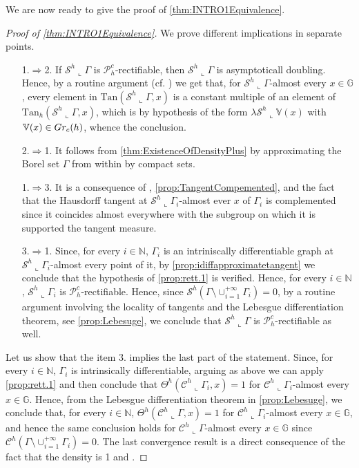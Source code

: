 \documentclass[10pt, a4paper,
oneside, headinclude,footinclude]{scrartcl}
\begin{document}
We are now ready to give the proof of \cref{thm:INTRO1Equivalence}.    
\begin{proof}[Proof of {\cref{thm:INTRO1Equivalence}}]
We prove different implications in separate points.

\begin{enumerate}
    \item[1.$\Rightarrow$2.] If $\mathcal{S}^h\llcorner\Gamma$ is $\mathscr{P}_h^c$-rectifiable, then $\mathcal{S}^h\llcorner\Gamma$ is asymptoticall doubling. Hence, by a routine argument (cf. \cite[Remark 14.4(3)]{Mattila1995GeometrySpaces}) we get that, for $\mathcal{S}^h\llcorner\Gamma$-almost every $x\in\mathbb G$, every element in $\mathrm{Tan}(\mathcal{S}^h\llcorner\Gamma,x)$ is a constant multiple of an element of $\mathrm{Tan}_h(\mathcal{S}^h\llcorner\Gamma,x)$, which is by hypothesis of the form $\lambda\mathcal{S}^h\llcorner\mathbb V(x)$ with $\mathbb V(x)\in Gr_c(h)$, whence the conclusion.
    \item[2.$\Rightarrow$1.] It follows from \cref{thm:ExistenceOfDensityPlus} by approximating the Borel set $\Gamma$ from within by compact sets.
    \item[1.$\Rightarrow$3.] It is a consequence of \cite[Theorem 1.8]{antonelli2020rectifiable},  \cref{prop:TangentCompemented}, and the fact that the Hausdorff tangent at $\mathcal{S}^h\llcorner\Gamma_i$-almost ever $x$ of $\Gamma_i$ is complemented since it coincides almost everywhere with the subgroup on which it is supported the tangent measure.
    \item[3.$\Rightarrow$1.] Since, for every $i\in\mathbb N$, $\Gamma_i$ is an intriniscally differentiable graph at $\mathcal{S}^h\llcorner\Gamma_i$-almost every point of it, by \cref{prop:idiffapproximatetangent} we conclude that the hypothesis of \cref{prop:rett.1} is verified. Hence, for every $i\in\mathbb N$, $\mathcal{S}^h\llcorner\Gamma_i$ is $\mathscr{P}_h^c$-rectifiable. Hence, since $\mathcal{S}^h(\Gamma\setminus\cup_{i=1}^{+\infty}\Gamma_i)=0$, by a routine argument involving the locality of tangents and the Lebesgue differentiation theorem, see \cref{prop:Lebesuge}, we conclude that $\mathcal{S}^h\llcorner\Gamma$ is $\mathscr{P}_h^c$-rectifiable as well.
\end{enumerate}
\medskip
Let us show that the item 3. implies the last part of the statement. Since, for every $i\in\mathbb N$, $\Gamma_i$ is intrinsically differentiable, arguing as above we can apply \cref{prop:rett.1} and then conclude that $\Theta^h(\mathcal{C}^h\llcorner\Gamma_i,x)=1$ for $\mathcal{C}^h\llcorner\Gamma_i$-almost every $x\in\mathbb G$. Hence, from the Lebesgue differentiation theorem in \cref{prop:Lebesuge}, we conclude that, for every $i\in\mathbb N$, $\Theta^h(\mathcal{C}^h\llcorner\Gamma,x)=1$ for $\mathcal{C}^h\llcorner\Gamma_i$-almost every $x\in\mathbb G$, and hence the same conclusion holds for $\mathcal{C}^h\llcorner\Gamma$-almost every $x\in\mathbb G$ since $\mathcal{C}^h(\Gamma\setminus\cup_{i=1}^{+\infty}\Gamma_i)=0$. The last convergence result is a direct consequence of the fact that the density is 1 and \cite[Proposition 2.26]{antonelli2020rectifiable}.
\end{proof}
\end{document}
